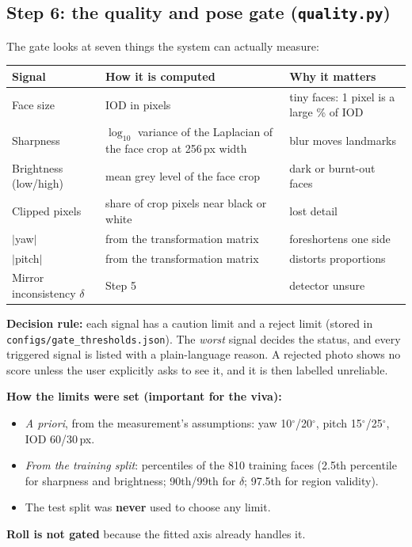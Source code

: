 \subsection{Step 6: the quality and pose gate (\texttt{quality.py})}
The gate looks at seven things the system can actually measure:
\begin{center}\small
\begin{tabular}{@{}p{3.4cm}p{6.6cm}p{5.4cm}@{}}
\toprule
Signal & How it is computed & Why it matters\\
\midrule
Face size & IOD in pixels & tiny faces: 1 pixel is a large \% of IOD\\
Sharpness & $\log_{10}$ variance of the Laplacian of the face crop at 256\,px width & blur moves landmarks\\
Brightness (low/high) & mean grey level of the face crop & dark or burnt-out faces\\
Clipped pixels & share of crop pixels near black or white & lost detail\\
$|$yaw$|$ & from the transformation matrix & foreshortens one side\\
$|$pitch$|$ & from the transformation matrix & distorts proportions\\
Mirror inconsistency $\delta$ & Step 5 & detector unsure\\
\bottomrule
\end{tabular}
\end{center}
\textbf{Decision rule:} each signal has a caution limit and a reject limit
(stored in \texttt{configs/\allowbreak gate\_thresholds.json}). The \emph{worst} signal decides the status, and every
triggered signal is listed with a plain-language reason. A rejected photo shows no score
unless the user explicitly asks to see it, and it is then labelled unreliable.

\textbf{How the limits were set (important for the viva):}
\begin{itemize}
\item \emph{A priori}, from the measurement's assumptions: yaw 10$^\circ$/20$^\circ$, pitch
15$^\circ$/25$^\circ$, IOD 60/30\,px.
\item \emph{From the training split}: percentiles of the 810 training faces (2.5th
percentile for sharpness and brightness; 90th/99th for $\delta$; 97.5th for region validity).
\item The test split was \textbf{never} used to choose any limit.
\end{itemize}
\textbf{Roll is not gated} because the fitted axis already handles it.

